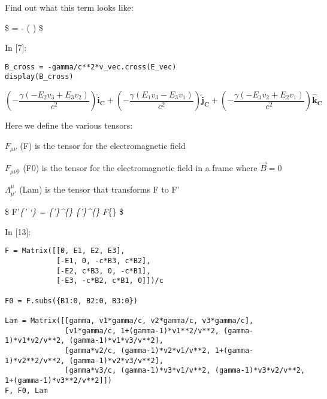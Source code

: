\documentclass[11pt]{article}
\newif\ifcode
\newif\ifleftmargins
\newlength{\promptlength}
\newcommand{\prompt}[3]{
        \needspace{1.1cm}
        \settowidth{\promptlength}{ #1 [#3] }
        \ifleftmargins\hspace{-\promptlength}\hspace{-5pt}\fi
        {\color{#2}#1 [#3]:}
        \ifleftmargins\vspace{-2.7ex}\fi
    }
\begin{document}
    Find out what this term looks like:

\$  = - ( \times {}) \$

    
\prompt{In}{incolor}{7}
\codetrue
\begin{tcolorbox}[breakable, size=fbox, boxrule=1pt, pad at break*=1mm, colback=cellbackground, colframe=cellborder]
\begin{verbatim}
B_cross = -gamma/c**2*v_vec.cross(E_vec)
display(B_cross)
\end{verbatim}
\end{tcolorbox}
\codefalse

    $$(- \frac{\gamma \left(- E_{2} v_{3} + E_{3} v_{2}\right)}{c^{2}})\mathbf{\hat{i}_{C}} + (- \frac{\gamma \left(E_{1} v_{3} - E_{3} v_{1}\right)}{c^{2}})\mathbf{\hat{j}_{C}} + (- \frac{\gamma \left(- E_{1} v_{2} + E_{2} v_{1}\right)}{c^{2}})\mathbf{\hat{k}_{C}}$$

    
    Here we define the various tensors:

\(F_{\mu \nu}\) (F) is the tensor for the electromagnetic field

\(F_{\mu \nu 0}\) (F0) is the tensor for the electromagnetic field in a
frame where \(\vec{B} = 0\)

\(\Lambda_{\mu'}^{\mu}\) (Lam) is the tensor that transforms F to F'

\$ F'\emph{\{\mu' \nu`\} = \Lambda\emph{\{\mu'\}\^{}\{\mu\}
\Lambda}\{\nu'\}\^{}\{\nu\} F}\{\mu \nu\} \$

    
\prompt{In}{incolor}{13}
\codetrue
\begin{tcolorbox}[breakable, size=fbox, boxrule=1pt, pad at break*=1mm, colback=cellbackground, colframe=cellborder]
\begin{verbatim}
F = Matrix([[0, E1, E2, E3], 
            [-E1, 0, -c*B3, c*B2], 
            [-E2, c*B3, 0, -c*B1], 
            [-E3, -c*B2, c*B1, 0]])/c

F0 = F.subs({B1:0, B2:0, B3:0})

Lam = Matrix([[gamma, v1*gamma/c, v2*gamma/c, v3*gamma/c], 
              [v1*gamma/c, 1+(gamma-1)*v1**2/v**2, (gamma-1)*v1*v2/v**2, (gamma-1)*v1*v3/v**2],
              [gamma*v2/c, (gamma-1)*v2*v1/v**2, 1+(gamma-1)*v2**2/v**2, (gamma-1)*v2*v3/v**2],
              [gamma*v3/c, (gamma-1)*v3*v1/v**2, (gamma-1)*v3*v2/v**2, 1+(gamma-1)*v3**2/v**2]])
F, F0, Lam
\end{verbatim}
\end{tcolorbox}
\codefalse
 
\end{document}
